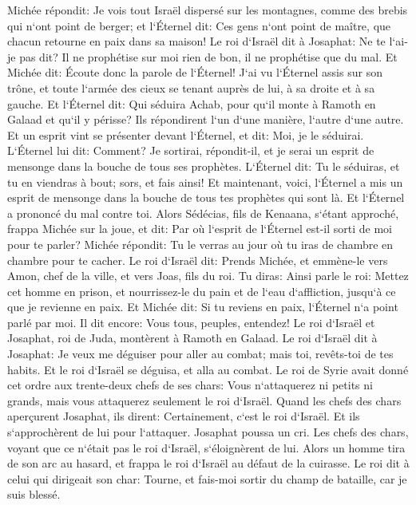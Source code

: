 \verse Michée répondit: Je vois tout Israël dispersé sur les montagnes, comme des brebis qui n`ont point de berger; et l`Éternel dit: Ces gens n`ont point de maître, que chacun retourne en paix dans sa maison! 
\verse Le roi d`Israël dit à Josaphat: Ne te l`ai-je pas dit? Il ne prophétise sur moi rien de bon, il ne prophétise que du mal. 
\verse Et Michée dit: Écoute donc la parole de l`Éternel! J`ai vu l`Éternel assis sur son trône, et toute l`armée des cieux se tenant auprès de lui, à sa droite et à sa gauche. 
\verse Et l`Éternel dit: Qui séduira Achab, pour qu`il monte à Ramoth en Galaad et qu`il y périsse? Ils répondirent l`un d`une manière, l`autre d`une autre. 
\verse Et un esprit vint se présenter devant l`Éternel, et dit: Moi, je le séduirai. L`Éternel lui dit: Comment? 
\verse Je sortirai, répondit-il, et je serai un esprit de mensonge dans la bouche de tous ses prophètes. L`Éternel dit: Tu le séduiras, et tu en viendras à bout; sors, et fais ainsi! 
\verse Et maintenant, voici, l`Éternel a mis un esprit de mensonge dans la bouche de tous tes prophètes qui sont là. Et l`Éternel a prononcé du mal contre toi. 
\verse Alors Sédécias, fils de Kenaana, s`étant approché, frappa Michée sur la joue, et dit: Par où l`esprit de l`Éternel est-il sorti de moi pour te parler? 
\verse Michée répondit: Tu le verras au jour où tu iras de chambre en chambre pour te cacher. 
\verse Le roi d`Israël dit: Prends Michée, et emmène-le vers Amon, chef de la ville, et vers Joas, fils du roi. 
\verse Tu diras: Ainsi parle le roi: Mettez cet homme en prison, et nourrissez-le du pain et de l`eau d`affliction, jusqu`à ce que je revienne en paix. 
\verse Et Michée dit: Si tu reviens en paix, l`Éternel n`a point parlé par moi. Il dit encore: Vous tous, peuples, entendez! 
\verse Le roi d`Israël et Josaphat, roi de Juda, montèrent à Ramoth en Galaad. 
\verse Le roi d`Israël dit à Josaphat: Je veux me déguiser pour aller au combat; mais toi, revêts-toi de tes habits. Et le roi d`Israël se déguisa, et alla au combat. 
\verse Le roi de Syrie avait donné cet ordre aux trente-deux chefs de ses chars: Vous n`attaquerez ni petits ni grands, mais vous attaquerez seulement le roi d`Israël. 
\verse Quand les chefs des chars aperçurent Josaphat, ils dirent: Certainement, c`est le roi d`Israël. Et ils s`approchèrent de lui pour l`attaquer. Josaphat poussa un cri. 
\verse Les chefs des chars, voyant que ce n`était pas le roi d`Israël, s`éloignèrent de lui. 
\verse Alors un homme tira de son arc au hasard, et frappa le roi d`Israël au défaut de la cuirasse. Le roi dit à celui qui dirigeait son char: Tourne, et fais-moi sortir du champ de bataille, car je suis blessé. 
